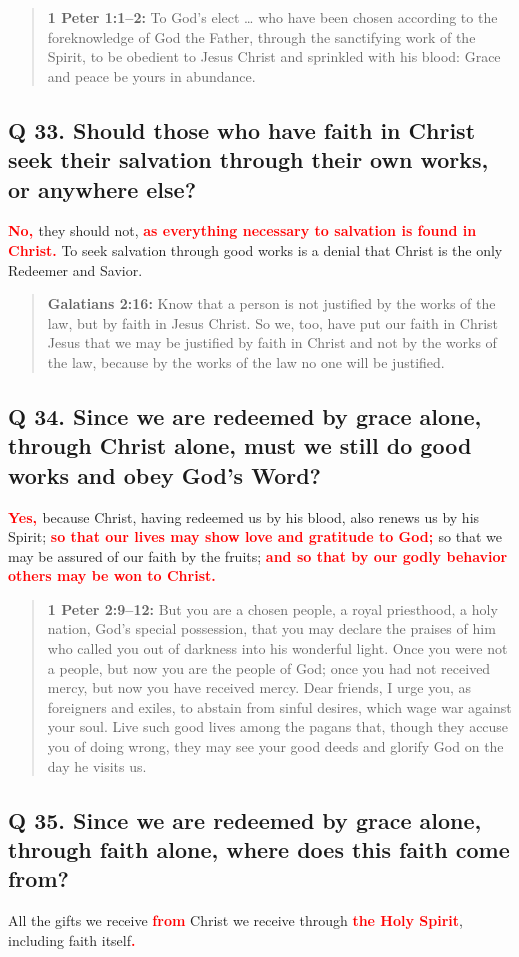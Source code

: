 \documentclass[]{memoir}
\newcommand\Children[1]{\textbf{\textcolor{red}{#1}}}
\newcommand\Quote[2]{\begin{quote}{\textbf{#1:}{ #2}}\end{quote}}
\begin{document}
\Quote{1 Peter 1:1--2}{To God's elect {\dots} who have been chosen according to the foreknowledge of God the Father, through the sanctifying work of the Spirit, to be obedient to Jesus Christ and sprinkled with his blood: Grace and peace be yours in abundance.}

\subsection{Q 33. Should those who have faith in Christ seek their salvation through their own works, or anywhere else?}
\Children{No, }they should not, \Children{as everything necessary to salvation is found in Christ.} To seek salvation through good works is a denial that Christ is the only Redeemer and Savior.

\Quote{Galatians 2:16}{Know that a person is not justified by the works of the law, but by faith in Jesus Christ. So we, too, have put our faith in Christ Jesus that we may be justified by faith in Christ and not by the works of the law, because by the works of the law no one will be justified.}

\subsection{Q 34. Since we are redeemed by grace alone, through Christ alone, must we still do good works and obey God's Word?}
\Children{Yes, }because Christ, having redeemed us by his blood, also renews us by his Spirit; \Children{so that our lives may show love and gratitude to God; }so that we may be assured of our faith by the fruits; \Children{and so that by our godly behavior others may be won to Christ.}

\Quote{1 Peter 2:9--12}{But you are a chosen people, a royal priesthood, a holy nation, God's special possession, that you may declare the praises of him who called you out of darkness into his wonderful light. Once you were not a people, but now you are the people of God; once you had not received mercy, but now you have received mercy. Dear friends, I urge you, as foreigners and exiles, to abstain from sinful desires, which wage war against your soul. Live such good lives among the pagans that, though they accuse you of doing wrong, they may see your good deeds and glorify God on the day he visits us.}

\subsection{Q 35. Since we are redeemed by grace alone, through faith alone, where does this faith come from?}
All the gifts we receive \Children{from} Christ we receive through \Children{the Holy Spirit}, including faith itself\Children{.}
\end{document}
